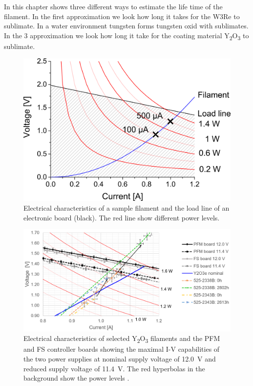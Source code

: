 		In this chapter shows three different ways to estimate the life time of the filament. In the first approximation we look how long it takes for the W3Re to sublimate. In a water environment tungsten forms tungsten oxid with sublimates. In the 3 approximation we look how long it take for the coating material Y\textsubscript{2}O\textsubscript{3} to sublimate.
		\begin{figure}[h]
			\centering
			\includegraphics[width=.7\textwidth]{Bilder/Fil_SampGraph.png}
			\caption{Electrical characteristics of a sample filament and the load line of an electronic board (black). The red line show different power levels.}
			\label{fig:FilSampGraph}
		\end{figure}
		\begin{figure}[h]
			\centering
			\includegraphics[width=\textwidth]{Bilder/Filament_RicosGraph.png}
			\caption{Electrical characteristics of selected Y\textsubscript{2}O\textsubscript{3} filaments and the PFM and FS controller boards showing the maximal I-V capabilities of the two power supplies at nominal supply voltage of 12.0~V and reduced supply voltage of 11.4~V. The red hyperbolas in the background show the power levels \cite{Diss_Fausch}.}
			\label{fig:FilRico}
		\end{figure}
		
